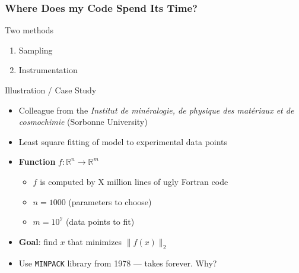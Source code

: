 \documentclass[xcolor={x11names,svgnames}]{beamer}
\newcommand{\red}{\alert}
\begin{document}
\begin{frame}
  \frametitle{Where Does my Code Spend Its Time?}
  
  \begin{block}{Two methods}
    \begin{enumerate}
    \item Sampling
    \item Instrumentation
    \end{enumerate}
  \end{block}

  \begin{exampleblock}{Illustration / Case Study}
    \begin{itemize}
    \item Colleague from the \emph{Institut de minéralogie, de physique des
        matériaux et de cosmochimie} (Sorbonne University) 

    \item Least square fitting of model to experimental data points

    \item \textbf{Function} $f : \mathbb{R}^{n} \rightarrow \mathbb{R}^{m}$
      \begin{itemize}
      \item $f$ is computed by X million lines of ugly Fortran code
      \item $n = 1000$ (parameters to choose)
      \item $m = 10^7$ (data points to fit)
      \end{itemize}

    \item \textbf{Goal}: find $x$ that minimizes $\|f(x)\|_2$
    \item Use \texttt{MINPACK} library from 1978 --- \red{takes forever}. Why?
  \end{itemize}
    
  \end{exampleblock}
  
\end{frame}

\end{document}
